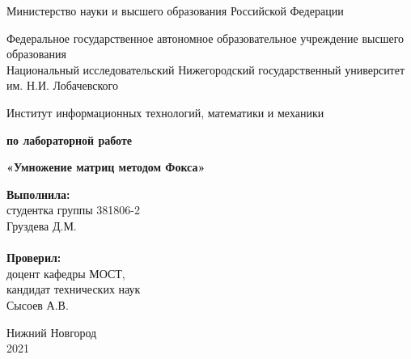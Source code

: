 \documentclass{article}
\begin{document}
\begin{titlepage}

\begin{center}
Министерство науки и высшего образования Российской Федерации
\end{center}

\begin{center}
Федеральное государственное автономное образовательное учреждение высшего образования \\
Национальный исследовательский Нижегородский государственный университет им. Н.И. Лобачевского
\end{center}

\begin{center}
Институт информационных технологий, математики и механики
\end{center}

\vspace{4em}

\begin{center}
\textbf{ по лабораторной работе} \\
\end{center}
\begin{center}
\textbf{\Large«Умножение матриц методом Фокса»} \\
\end{center}

\vspace{4em}

\newbox{\lbox}
\newlength{\maxl}
\setlength{\maxl}{\wd\lbox}
\hfill\parbox{7cm}{
\hspace*{5cm}\hspace*{-5cm}\textbf{Выполнила:} \\ студентка группы 381806-2 \\ Груздева Д.М.\\
\\
\hspace*{5cm}\hspace*{-5cm}\textbf{Проверил:}\\ доцент кафедры МОСТ, \\ кандидат технических наук \\ Сысоев А.В.\\
}
\vspace{\fill}

\begin{center} Нижний Новгород \\ 2021 \end{center}

\end{titlepage}
\end{document}
